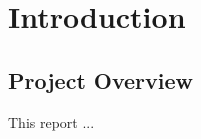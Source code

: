 \documentclass[11pt, oneside, a4paper]{article}
\begin{document}
\clearpage
\maketitle

\newpage
\setcounter{page}{1}
\tableofcontents
\newpage

\section{Introduction}
\subsection{Project Overview}

This report ...
\end{document}
